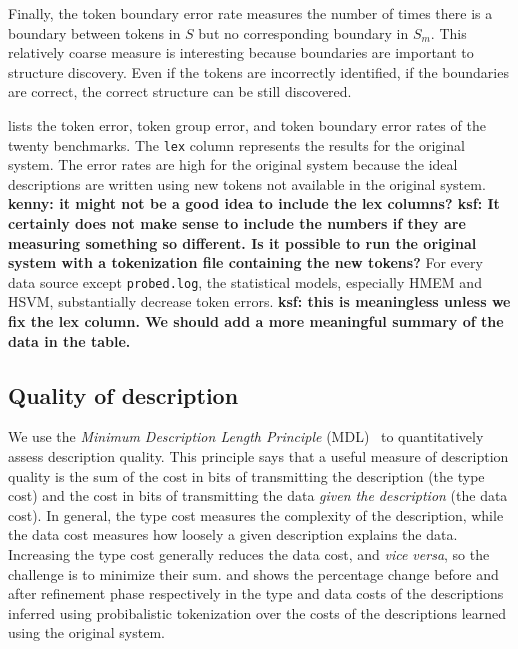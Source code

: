 Finally, the token boundary error rate measures the number of times
there is a boundary between tokens in $S$ but no corresponding
boundary in $S_m$.  This relatively coarse measure is interesting
because boundaries are important to structure discovery. Even if the
tokens are incorrectly identified, if the boundaries are correct, the
correct structure can be still discovered.

 lists the token error, token group error, and token
boundary error rates of the twenty benchmarks.  The {\tt lex} column
represents the results for the original \learnpads{} system.
The error rates are
high for the original system because the ideal \pads{} descriptions are
written using new tokens not available in the original system.
{\bf kenny: it might not be a good idea to include the lex columns?
ksf: It certainly does not make sense to include the numbers if they
are measuring something so different.  Is it possible to run the
original system with a tokenization file containing the new tokens?
}
For every data source except {\tt probed.log}, the
statistical models, especially HMEM and HSVM, substantially decrease token errors.
{\bf ksf: this is meaningless unless we fix the lex column.  We should
add a more meaningful summary of the data in the table.}

\subsection{Quality of description}
We use the {\em Minimum Description Length Principle}
(MDL)~\cite{mdlbook} to quantitatively assess description quality.
This principle says that a useful measure of description quality is
the sum of the cost in bits of transmitting the description (the
type cost) and the cost in bits of transmitting the data
\textit{given the description} (the data cost).  In general, the
type cost measures the complexity of the description, while the data
cost measures how loosely a given description explains the data.
Increasing the type cost generally reduces the data cost, and
\textit{vice versa}, so the challenge is to minimize their sum.
 and  shows the
percentage change before and after refinement phase respectively in
the type and data costs of the descriptions inferred using
probibalistic tokenization over the costs of the descriptions
learned using the original \learnpads{} system.

